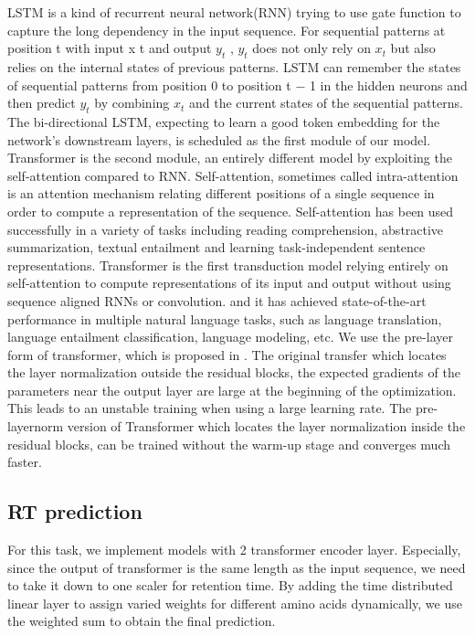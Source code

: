 \documentclass[final]{cvpr}
\begin{document}
LSTM is a kind of recurrent neural network(RNN) trying to use gate function to capture the long dependency in the input sequence. 
For sequential patterns at position t with input x t and output $y_t$ , $y_t$ does not only rely on $x_t$ but also relies on the 
internal states of previous patterns. LSTM can remember the states of sequential patterns from position 0 to position t − 1 
in the hidden neurons and then predict $y_t$ by combining $x_t$ and the current states of the sequential patterns.
The bi-directional LSTM, expecting to learn a good token embedding for the network's downstream layers, is scheduled as the first module
of our model. Transformer\cite{vaswani2017attention} is the second module, an entirely different model by exploiting the self-attention compared to RNN. 
Self-attention, sometimes called intra-attention is an attention mechanism relating different positions of a single sequence in 
order to compute a representation of the sequence. Self-attention has been used successfully in a variety of tasks including reading 
comprehension, abstractive summarization, textual entailment and learning task-independent sentence representations.
Transformer is the first transduction model relying entirely on self-attention to compute representations of its input and output without 
using sequence aligned RNNs or convolution.
and it has achieved state-of-the-art performance in multiple natural language tasks, such as language translation, language 
entailment classification, language modeling, etc. We use the pre-layer form of transformer, which is proposed in \cite{xiong2020layer}.
The original transfer which locates the layer normalization outside the residual blocks, 
the expected gradients of the parameters near the output layer are large at the beginning of the optimization.
This leads to an unstable training when using a large learning rate. The pre-layernorm version of Transformer which 
 locates the layer normalization inside the residual blocks, can be trained without the warm-up stage and converges much faster.

\subsection{RT prediction}

For this task, we implement 
models with 2 transformer encoder layer.
Especially, since the output of transformer is the same length as the input sequence, we need to take it down to one scaler for 
retention time. By adding the time distributed linear layer to assign varied weights for different amino acids dynamically,
we use the weighted sum to obtain the final prediction. 
\end{document}

